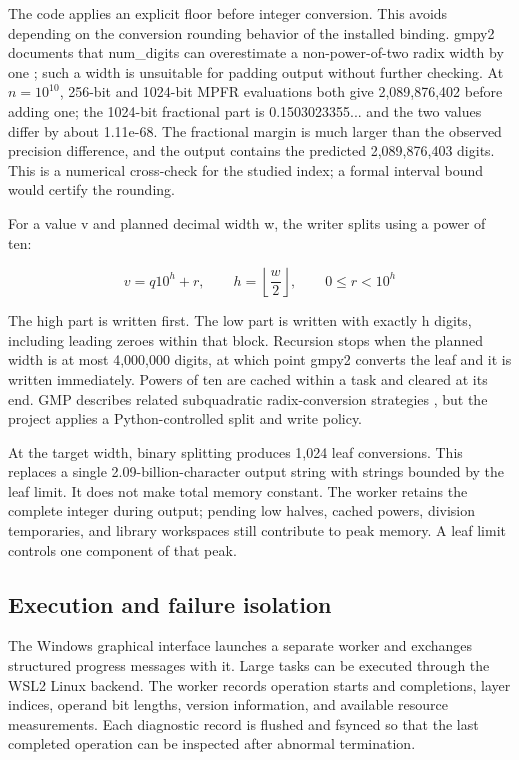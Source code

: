 \documentclass[11pt,a4paper]{article}
\begin{document}
The code applies an explicit floor before integer conversion. This avoids depending on the conversion rounding behavior of the installed binding. gmpy2 documents that num\_\allowbreak{}digits can overestimate a non-power-of-two radix width by one \cite{gmpy2_mpz}; such a width is unsuitable for padding output without further checking. At $n=10^{10}$, 256-bit and 1024-bit MPFR evaluations both give 2,089,876,402 before adding one; the 1024-bit fractional part is 0.1503023355... and the two values differ by about 1.11e-68. The fractional margin is much larger than the observed precision difference, and the output contains the predicted 2,089,876,403 digits. This is a numerical cross-check for the studied index; a formal interval bound would certify the rounding.

For a value v and planned decimal width w, the writer splits using a power of ten:

\begin{equation}
v=q10^h+r,\qquad h=\left\lfloor\frac{w}{2}\right\rfloor,\qquad 0\le r<10^h
\end{equation}

The high part is written first. The low part is written with exactly h digits, including leading zeroes within that block. Recursion stops when the planned width is at most 4,000,000 digits, at which point gmpy2 converts the leaf and it is written immediately. Powers of ten are cached within a task and cleared at its end. GMP describes related subquadratic radix-conversion strategies \cite{gmp_radix}, but the project applies a Python-controlled split and write policy.

At the target width, binary splitting produces 1,024 leaf conversions. This replaces a single 2.09-billion-character output string with strings bounded by the leaf limit. It does not make total memory constant. The worker retains the complete integer during output; pending low halves, cached powers, division temporaries, and library workspaces still contribute to peak memory. A leaf limit controls one component of that peak.

\subsection{Execution and failure isolation}

The Windows graphical interface launches a separate worker and exchanges structured progress messages with it. Large tasks can be executed through the WSL2 Linux backend. The worker records operation starts and completions, layer indices, operand bit lengths, version information, and available resource measurements. Each diagnostic record is flushed and fsynced so that the last completed operation can be inspected after abnormal termination.
\end{document}
